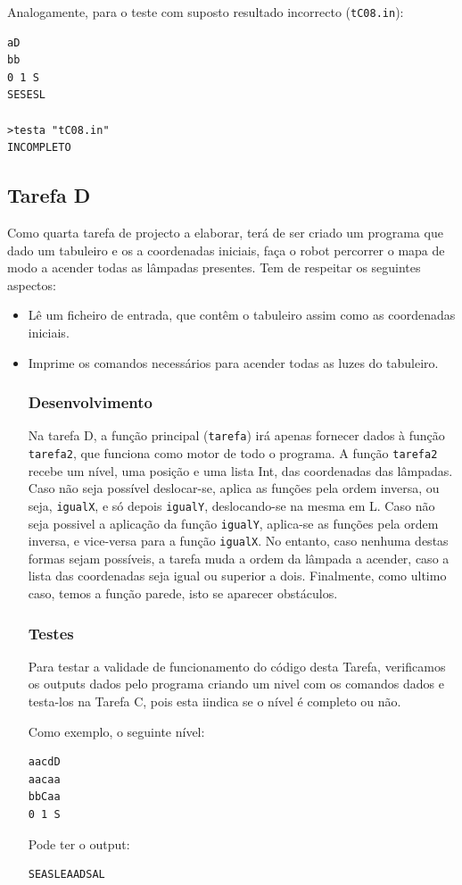 \documentclass[a4paper]{article}
\begin{document}
Analogamente, para o teste com suposto resultado incorrecto (\verb|tC08.in|):
\begin{verbatim}
aD
bb
0 1 S
SESESL

>testa "tC08.in"
INCOMPLETO
\end{verbatim}

\break
\subsection{Tarefa D}
Como quarta tarefa de projecto a elaborar, terá de ser criado um programa que dado um tabuleiro e os a coordenadas iniciais, faça o robot percorrer o mapa de modo a acender todas as lâmpadas presentes.
Tem de respeitar os seguintes aspectos:
\begin{itemize}
\item Lê um ficheiro de entrada, que contêm o tabuleiro assim como as coordenadas iniciais.
\item Imprime os comandos necessários para acender todas as luzes do tabuleiro.

\subsubsection{Desenvolvimento}

Na tarefa D, a função principal (\verb|tarefa|) irá apenas fornecer dados à função \verb|tarefa2|, que funciona como motor de todo o programa. 
A função \verb|tarefa2| recebe um nível, uma posição e uma lista Int, das coordenadas das lâmpadas. Caso não seja possível deslocar-se, aplica as funções pela ordem inversa, ou seja, \verb|igualX|, e só depois \verb|igualY|, deslocando-se na mesma em L. Caso não seja possivel a aplicação da função \verb|igualY|, aplica-se as funções pela ordem inversa, e vice-versa para a função \verb|igualX|. No entanto, caso nenhuma destas formas sejam possíveis, a tarefa muda a ordem da lâmpada a acender, caso a lista das coordenadas seja igual ou superior a dois. Finalmente, como ultimo caso, temos a função parede, isto se aparecer obstáculos.

\subsubsection{Testes}

Para testar a validade de funcionamento do código desta Tarefa, verificamos os outputs dados pelo programa criando um nivel com os comandos dados e testa-los na Tarefa C, pois esta iindica se o nível é completo ou não.

Como exemplo, o seguinte nível:
\begin{verbatim}
aacdD
aacaa
bbCaa
0 1 S
\end{verbatim}

Pode ter o output:
\begin{verbatim}
SEASLEAADSAL
\end{verbatim}

\end{itemize}
\break
\end{document}
